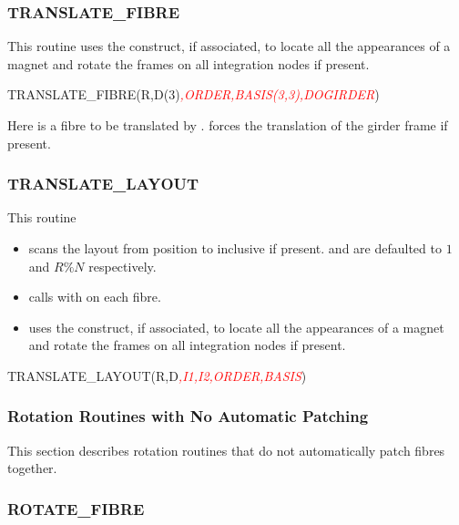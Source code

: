 \subsubsection*{TRANSLATE_FIBRE}

%
This routine uses the  construct, if associated, to locate
all the appearances of a magnet and rotate the frames on all integration
nodes if present.

\begin{ptccode}
TRANSLATE_FIBRE(R,D(3)\textit{\textcolor{red}{,ORDER,BASIS(3,3),DOGIRDER}})
\end{ptccode}

Here  is a fibre to be translated by .  forces the
translation of the girder frame if present.


\subsubsection*{TRANSLATE_LAYOUT}

%
This routine
\begin{itemize}
  \item scans the layout  from position  to  inclusive if
present.  and  are defaulted to $1$ and $R \% N$ respectively.
  \item calls  with 
on each fibre.
  \item uses the  construct, if associated, to locate all the appearances
of a magnet and rotate the frames on all integration nodes if present.
\end{itemize}

\begin{ptccode}
TRANSLATE_LAYOUT(R,D\textit{\textcolor{red}{,I1,I2,ORDER,BASIS}})
\end{ptccode}


\subsubsection{Rotation Routines with No Automatic Patching}

%
This section describes rotation routines that do not automatically patch 
fibres together.


\subsubsection*{ROTATE_FIBRE}


